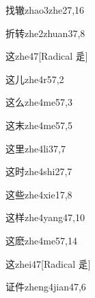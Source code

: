 \begin{verbete}{找辙}{zhao3zhe2}{7,16}
\end{verbete}

\begin{verbete}{折转}{zhe2zhuan3}{7,8}
\end{verbete}

\begin{verbete}{这}{zhe4}{7}[Radical 辵]
\end{verbete}

\begin{verbete}{这儿}{zhe4r5}{7,2}
\end{verbete}

\begin{verbete}{这么}{zhe4me5}{7,3}
\end{verbete}

\begin{verbete}{这末}{zhe4me5}{7,5}
\end{verbete}

\begin{verbete}{这里}{zhe4li3}{7,7}
\end{verbete}

\begin{verbete}{这时}{zhe4shi2}{7,7}
\end{verbete}

\begin{verbete}{这些}{zhe4xie1}{7,8}
\end{verbete}

\begin{verbete}{这样}{zhe4yang4}{7,10}
\end{verbete}

\begin{verbete}{这麽}{zhe4me5}{7,14}
\end{verbete}

\begin{verbete}{这}{zhei4}{7}[Radical 辵]
\end{verbete}

\begin{verbete}{证件}{zheng4jian4}{7,6}
\end{verbete}


